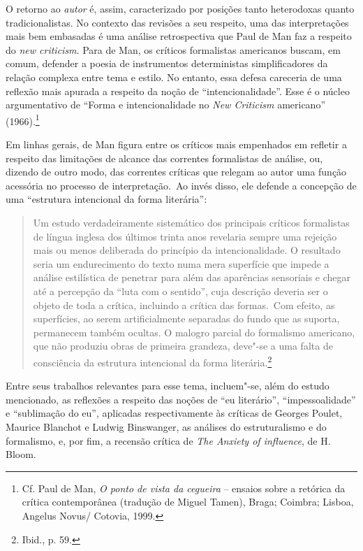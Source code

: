 O retorno ao \emph{autor} é, assim, caracterizado por posições tanto
heterodoxas quanto tradicionalistas. No contexto das revisões a seu respeito, uma das interpretações mais bem embasadas é
uma análise retrospectiva que Paul de Man faz a respeito do \emph{new
criticism}. Para de Man, os críticos formalistas americanos buscam, em
comum, defender a poesia de instrumentos deterministas simplificadores
da relação complexa entre tema e estilo. No entanto, essa defesa
careceria de uma reflexão mais apurada a respeito da noção de
``intencionalidade''. Esse é o núcleo argumentativo de ``Forma e
intencionalidade no \emph{New Criticism} americano'' (1966).\footnote{Cf.
  Paul de Man, \emph{O ponto de vista da cegueira} -- ensaios sobre a
  retórica da crítica contemporânea (tradução de Miguel Tamen), Braga;
  Coimbra; Lisboa, Angelus Novus/ Cotovia, 1999.}

Em linhas gerais, de Man figura entre os críticos mais empenhados em
refletir a respeito das limitações de alcance das correntes formalistas
de análise, ou, dizendo de outro modo, das correntes críticas que
relegam ao autor uma função acessória no processo de interpretação.~Ao
invés disso, ele defende a concepção de uma ``estrutura intencional da
forma literária'':

\begin{quote}
Um estudo verdadeiramente sistemático dos principais críticos
formalistas de língua inglesa dos últimos trinta anos revelaria sempre
uma rejeição mais ou menos deliberada do princípio da intencionalidade.
O resultado seria um endurecimento do texto numa mera superfície que
impede a análise estilística de penetrar para além das aparências
sensoriais e chegar até a percepção da ``luta com o sentido'', cuja
descrição deveria ser o objeto de toda a crítica, incluindo a crítica
das formas.~Com efeito, as superfícies, ao serem artificialmente
separadas do fundo que as suporta, permanecem também ocultas. O malogro
parcial do formalismo americano, que não produziu obras de primeira
grandeza, deve"-se a uma falta de consciência da estrutura intencional da
forma literária.\footnote{Ibid., p. 59.}
\end{quote}

Entre seus trabalhos relevantes para esse tema, incluem"-se, além do
estudo mencionado, as reflexões a respeito das noções de ``eu
literário'', ``impessoalidade'' e ``sublimação do eu'', aplicadas
respectivamente às críticas de Georges Poulet, Maurice Blanchot e Ludwig Binswanger, as análises do estruturalismo e do formalismo, e, por fim, a
recensão crítica de \emph{The Anxiety of influence}, de H. Bloom.

